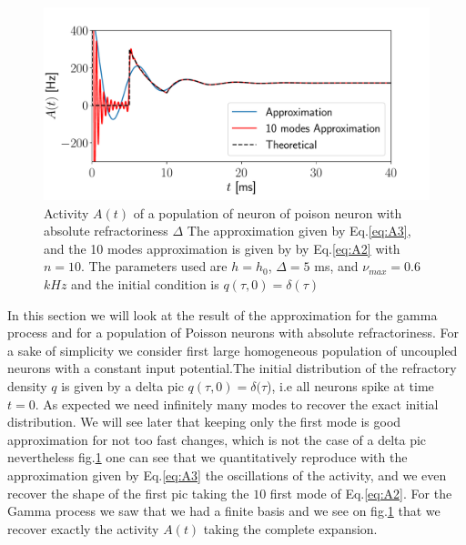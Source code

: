 \documentclass[12pt,twoside]{report}
\begin{document}
\begin{figure}[h!]
	\centering
	\includegraphics[width=0.8\linewidth]{delta_poisson.pdf}
	\caption{Activity $A(t)$ of a population of neuron of poison neuron with absolute refractoriness $\Delta$ The approximation given by Eq.\eqref{eq:A3}, and the 10 modes approximation is given by  by Eq.\ref{eq:A2} with $n=10$. The parameters used are $h=h_0$, $\Delta=5$ ms, and $\nu_{max}=0.6$ $kHz$  and the initial condition is $q(\tau,0)=\delta(\tau)$}
	\label{fig:delta_poisson}
\end{figure}


In this section we will look at the result of the approximation for the gamma process and for a population of Poisson neurons with absolute refractoriness. For a sake of simplicity we consider first  large homogeneous population of uncoupled neurons with a constant input potential.The initial distribution of the refractory density $q$ is given by a delta pic $q(\tau,0)=\delta(\tau$), i.e all neurons spike at time $t=0$.
As expected we need infinitely many modes to recover the exact initial distribution. We will see later that keeping only the first mode is good approximation for not too fast changes, which is not the case of a delta pic nevertheless  fig.\ref{fig:delta_poisson} one can see that we quantitatively reproduce with the approximation given by Eq.\eqref{eq:A3} the oscillations of the activity, and we even recover the shape of the first pic taking the $10$ first mode of Eq.\eqref{eq:A2}.
For the Gamma process we saw that we had a finite basis and we see on fig.\ref{fig:delta_poisson} that we recover exactly the activity $A(t)$ taking the complete expansion.
\end{document}
